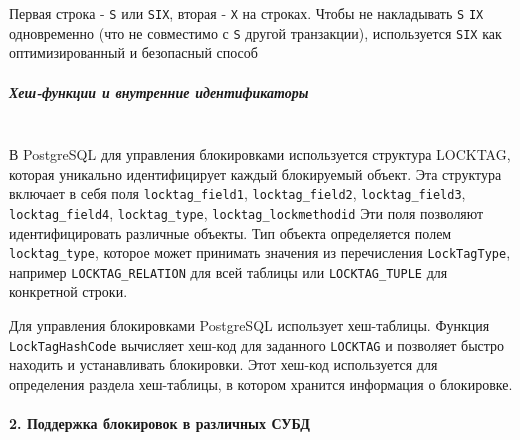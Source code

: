  Первая строка - \texttt{S} или \texttt{SIX}, вторая - \texttt{X} на строках. 
 Чтобы не накладывать \texttt{S} \+ \texttt{IX} одновременно (что не совместимо с \texttt{S} другой транзакции), используется \texttt{SIX} как оптимизированный и безопасный способ

\subparagraph{Хеш-функции и внутренние идентификаторы} ~\\

 В PostgreSQL для управления блокировками используется структура LOCKTAG, которая уникально идентифицирует каждый блокируемый объект. Эта структура включает в себя поля \texttt{locktag\_field1}, \texttt{locktag\_field2}, \texttt{locktag\_field3}, \texttt{locktag\_field4}, \texttt{locktag\_type}, \texttt{locktag\_lockmethodid} \autocite{PostgreSQLlockh1, PostgreSQLlockh2}
 Эти поля позволяют идентифицировать различные объекты. Тип объекта определяется полем \texttt{locktag\_type}, которое может принимать значения из перечисления \texttt{LockTagType}, например \texttt{LOCKTAG\_RELATION} для всей таблицы или \texttt{LOCKTAG\_TUPLE} для конкретной строки.
 
 Для управления блокировками PostgreSQL использует хеш-таблицы. Функция \texttt{LockTagHashCode} вычисляет хеш-код для заданного \texttt{LOCKTAG} и позволяет быстро находить и устанавливать блокировки. Этот хеш-код используется для определения раздела хеш-таблицы, в котором хранится информация о блокировке. \autocite{PostgreSQLlockc1, PostgreSQLlockc2}

\paragraph{2. Поддержка блокировок в различных СУБД} ~\\

